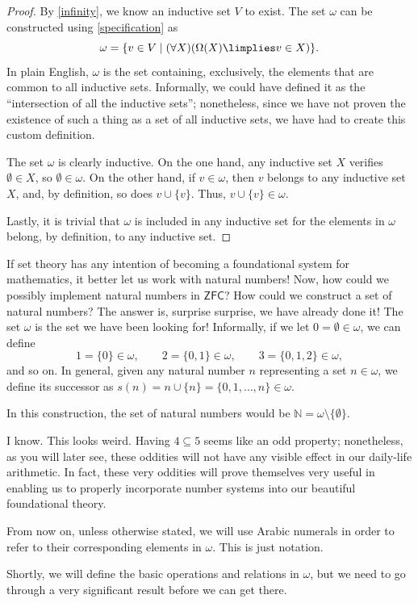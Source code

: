 \begin{proof}
By \ref{infinity}, we know an inductive set $V$ to exist. The set $\omega$ can be constructed using \ref{specification} as
\[ \omega = \{v\in V\mid (\forall X)(\Omega(X)\limplies v\in X)\}.\]
In plain English, $\omega$ is the set containing, exclusively, the elements that are common to all inductive sets.
Informally, we could have defined it as the ``intersection of all the inductive sets''; nonetheless, since we have not proven the existence of such a thing as a set of all inductive sets, we have had to create this custom definition.

The set $\omega$ is clearly inductive. On the one hand, any inductive set $X$ verifies $\emptyset \in X$, so $\emptyset\in \omega$.
On the other hand, if $v\in\omega$, then $v$ belongs to any inductive set $X$, and, by definition, so does $v\cup\{v\}$. Thus, $v\cup\{v\}\in \omega$.

Lastly, it is trivial that $\omega$ is included in any inductive set for the elements in $\omega$ belong, by definition, to any inductive set.
\end{proof}


\begin{para}
If set theory has any intention of becoming a foundational system for mathematics, it better let us work with natural numbers!
Now, how could we possibly implement natural numbers in $\mathsf{ZFC}$? How could we construct a set of natural numbers?
The answer is, surprise surprise, we have already done it! The set $\omega$ is the set we have been looking for! Informally, if we let $0 = \emptyset\in \omega$, we can define
\[ 1 = \{0\}\in \omega,\qquad 2 = \{0,1\} \in \omega, \qquad 3 = \{0,1,2\}\in \omega,\]
and so on. In general, given any natural number $n$ representing a set $n\in \omega$, we define its successor as $s(n) = n \cup \{n\} = \{0,1,\ldots,n\}\in \omega$. 

In this construction, the set of natural numbers would be $\mathbb{N} = \omega \setminus \{\emptyset\}$.

I know. This looks weird. Having $4\subseteq 5$ seems like an odd property; nonetheless, as you will later see, these oddities will not have any visible effect in our daily-life arithmetic.
In fact, these very oddities will prove themselves very useful in enabling us to properly incorporate number systems into our beautiful foundational theory.

From now on, unless otherwise stated, we will use Arabic numerals in order to refer to their corresponding elements in $\omega$. This is just notation.

Shortly, we will define the basic operations and relations in $\omega$, but we need to go through a very significant result before we can get there.
\end{para}

